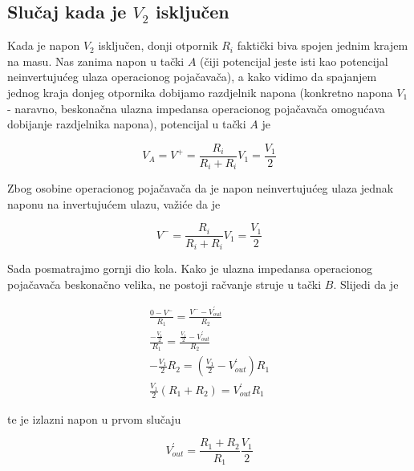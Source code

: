 \documentclass[11pt]{article}
\begin{document}
        \subsection{Slučaj kada je $V_2$ isključen}
            
            Kada je napon $V_2$ isključen, donji otpornik $R_i$ faktički biva spojen jednim krajem na masu. Nas zanima napon
            u tački $A$ (čiji potencijal jeste isti kao potencijal neinvertujućeg ulaza operacionog pojačavača), a kako vidimo
            da spajanjem jednog kraja donjeg otpornika dobijamo razdjelnik napona (konkretno napona $V_1$ -
            naravno, beskonačna ulazna impedansa operacionog pojačavača omogućava dobijanje razdjelnika napona), 
            potencijal u tački $A$ je

            \begin{equation}
                V_A = V^+ = \frac{R_i}{R_i + R_i}V_1 = \frac{V_1}{2}
            \end{equation}

            Zbog osobine operacionog pojačavača da je napon neinvertujućeg ulaza jednak naponu na invertujućem ulazu, važiće
            da je 

            \begin{equation}
                V^- = \frac{R_i}{R_i + R_i}V_1 = \frac{V_1}{2}
            \end{equation}

            Sada posmatrajmo gornji dio kola. Kako je ulazna impedansa operacionog pojačavača beskonačno velika,
            ne postoji račvanje struje u tački $B$. Slijedi da je 

            \begin{gather}
                    \frac{0 - V^-}{R_1} = \frac{V^- - V^{'}_{out}}{R_2} \\
                    \frac{-\frac{V_1}{2}}{R_1} = \frac{\frac{V_1}{2} - V^{'}_{out}}{R_2} \\
                    -\frac{V_1}{2}R_2 = (\frac{V_1}{2} - V^{'}_{out})R_1 \\
                    \frac{V_1}{2}\left(R_1 + R_2\right) = V^{'}_{out}R_1 
            \end{gather}

            te je izlazni napon u prvom slučaju

            \begin{equation}
                V^{'}_{out} = \frac{R_1 + R_2}{R_1} \frac{V_1}{2}
            \end{equation}
\end{document}
